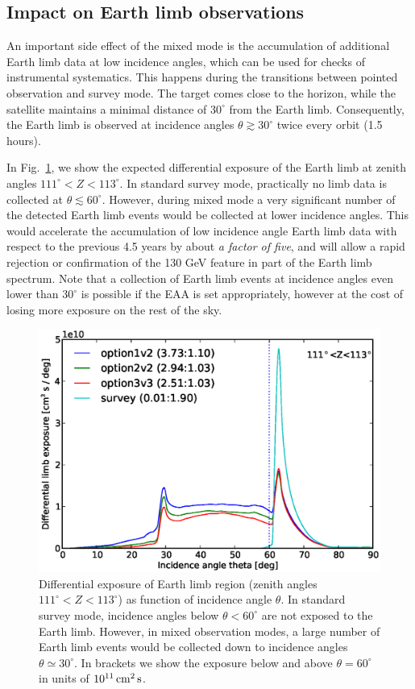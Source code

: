 \documentclass[aps,prd,superscriptaddress,showpacs,nofootinbib,fixlfloat, 12pt]{revtex4-1}
\begin{document}
\subsection{Impact on Earth limb observations}
An important side effect of the mixed mode is the accumulation of
additional Earth limb data at low incidence angles, which can be used for
checks of instrumental systematics. This happens during the
transitions between pointed observation and survey mode. The target comes
close to the horizon, while the satellite maintains a minimal distance of
$30^\circ$ from the Earth limb. Consequently, the Earth limb is observed at
incidence angles $\theta\gtrsim30^\circ$ twice every orbit (1.5 hours).

In Fig.~\ref{fig:limb_exposure}, we show the expected differential exposure of
the Earth limb at zenith angles $111^\circ<Z<113^\circ$. In standard survey
mode, practically no limb data is collected at $\theta\lesssim60^\circ$.
However, during mixed mode a very significant number of the detected Earth
limb events would be collected at lower incidence angles. This would
accelerate the accumulation of low incidence angle Earth limb data with
respect to the previous 4.5 years by about \emph{a factor of five}, and will
allow a rapid rejection or confirmation of the 130 GeV feature in part of the
Earth limb spectrum. Note that a collection of Earth limb events at incidence
angles even lower than $30^\circ$ is possible if the EAA is set appropriately,
however at the cost of losing more exposure on the rest of the sky.

\begin{figure}[t]
  \begin{center}
    \includegraphics[width=0.6\linewidth]{plots/limb_exposure.eps}
    \vspace{-0.5cm}
  \end{center}
  \caption{Differential exposure of Earth limb region (zenith angles
    $111^\circ<Z<113^\circ$) as function of incidence angle $\theta$. In
    standard survey mode, incidence angles below $\theta<60^\circ$ are not
    exposed to the Earth limb. However, in mixed observation modes, a
    large number of Earth limb events would be collected down to incidence
    angles $\theta\simeq30^\circ$. In brackets we show the exposure below and
  above $\theta=60^\circ$ in units of $10^{11}\rm\,cm^2\,s$.}
  \label{fig:limb_exposure}
\end{figure}
\end{document}
